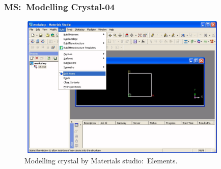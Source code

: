 \frame
{
	\frametitle{\textrm{MS:~Modelling Crystal-04}}
\begin{figure}[h!]
\centering
\vspace*{-0.10in}
\includegraphics[height=2.70in,width=4.00in,viewport=0 0 1090 759,clip]{Figures/MS-New_Project-09.png}
\caption{\tiny \textrm{Modelling crystal by Materials studio:~Elements.}}%
\label{MS-Modelling-Crystal-04}
\end{figure}
}
%
%
%
%
